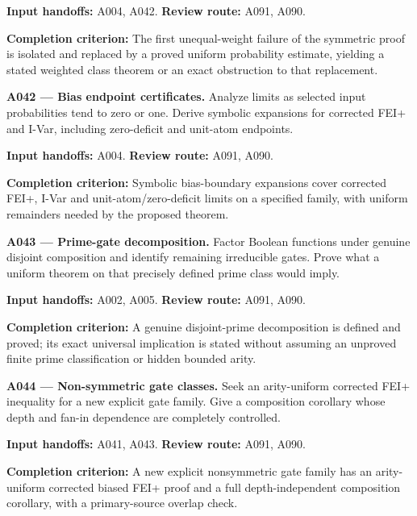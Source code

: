 \documentclass[11pt]{article}
\begin{document}
{\small\color{ink}\textbf{Input handoffs:} A004, A042. \textbf{Review route:} A091, A090.\par
\textbf{Completion criterion:} The first unequal-weight failure of the symmetric proof is isolated and replaced by a proved uniform probability estimate, yielding a stated weighted class theorem or an exact obstruction to that replacement.\par}



\textbf{A042 --- Bias endpoint certificates.} Analyze limits as selected input probabilities tend to zero or one. Derive symbolic expansions for corrected FEI+ and I-Var, including zero-deficit and unit-atom endpoints.

{\small\color{ink}\textbf{Input handoffs:} A004. \textbf{Review route:} A091, A090.\par
\textbf{Completion criterion:} Symbolic bias-boundary expansions cover corrected FEI+, I-Var and unit-atom/zero-deficit limits on a specified family, with uniform remainders needed by the proposed theorem.\par}



\textbf{A043 --- Prime-gate decomposition.} Factor Boolean functions under genuine disjoint composition and identify remaining irreducible gates. Prove what a uniform theorem on that precisely defined prime class would imply.

{\small\color{ink}\textbf{Input handoffs:} A002, A005. \textbf{Review route:} A091, A090.\par
\textbf{Completion criterion:} A genuine disjoint-prime decomposition is defined and proved; its exact universal implication is stated without assuming an unproved finite prime classification or hidden bounded arity.\par}



\textbf{A044 --- Non-symmetric gate classes.} Seek an arity-uniform corrected FEI+ inequality for a new explicit gate family. Give a composition corollary whose depth and fan-in dependence are completely controlled.

{\small\color{ink}\textbf{Input handoffs:} A041, A043. \textbf{Review route:} A091, A090.\par
\textbf{Completion criterion:} A new explicit nonsymmetric gate family has an arity-uniform corrected biased FEI+ proof and a full depth-independent composition corollary, with a primary-source overlap check.\par}
\end{document}
